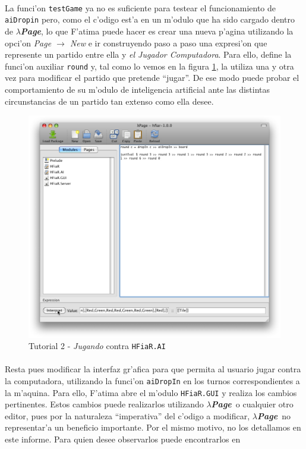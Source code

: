 \documentclass[a4paper]{article}
\newcommand{\hpage}{\textbf{\textsl{$\lambda$Page}}}
\begin{document}
\paragraph{} La funci'on \texttt{testGame} ya no es suficiente para testear el funcionamiento de \texttt{aiDropin} pero, como el c'odigo est'a en un m'odulo que ha sido cargado dentro de \hpage, lo que F'atima puede hacer es crear una nueva p'agina utilizando la opci'on \textsl{Page $\rightarrow$ New} e ir construyendo paso a paso una expresi'on que represente un partido entre ella y \textsl{el Jugador Computadora}.  Para ello, define la funci'on auxiliar \texttt{round} y, tal como lo vemos en la figura \ref{tut210}, la utiliza una y otra vez para modificar el partido que pretende ``jugar''.  De ese modo puede probar el comportamiento de su m'odulo de inteligencia artificial ante las distintas circunstancias de un partido tan extenso como ella desee.
\begin{figure}[hp]
	\begin{center}
        	\includegraphics[width=.75\textwidth]{pictures/tut2/09}
		\caption{Tutorial 2 - \textsl{Jugando} contra \texttt{HFiaR.AI}}
		\label{tut210}
	\end{center}
\end{figure}
\paragraph{}Resta pues modificar la interfaz gr'afica para que permita al usuario jugar contra la computadora, utilizando la funci'on \texttt{aiDropIn} en los turnos correspondientes a la m'aquina.  Para ello, F'atima abre el m'odulo \texttt{HFiaR.GUI} y realiza los cambios pertinentes.  Estos cambios puede realizarlos utilizando \hpage\ o cualquier otro editor, pues por la naturaleza ``imperativa'' del c'odigo a modificar, \hpage\ no representar'a un beneficio importante.  Por el mismo motivo, no los detallamos en este informe.  Para quien desee observarlos puede encontrarlos en ~\cite{hfiar}
\end{document}
